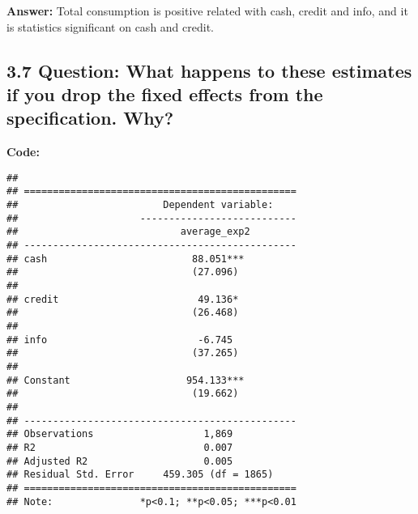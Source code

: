 \documentclass[
]{article}
\newenvironment{Shaded}{\begin{snugshade}}{\end{snugshade}}
\newcommand{\AttributeTok}[1]{\textcolor[rgb]{0.13,0.29,0.53}{#1}}
\newcommand{\ConstantTok}[1]{\textcolor[rgb]{0.56,0.35,0.01}{#1}}
\newcommand{\DecValTok}[1]{\textcolor[rgb]{0.00,0.00,0.81}{#1}}
\newcommand{\FloatTok}[1]{\textcolor[rgb]{0.00,0.00,0.81}{#1}}
\newcommand{\FunctionTok}[1]{\textcolor[rgb]{0.13,0.29,0.53}{\textbf{#1}}}
\newcommand{\NormalTok}[1]{#1}
\newcommand{\OtherTok}[1]{\textcolor[rgb]{0.56,0.35,0.01}{#1}}
\newcommand{\SpecialCharTok}[1]{\textcolor[rgb]{0.81,0.36,0.00}{\textbf{#1}}}
\newcommand{\StringTok}[1]{\textcolor[rgb]{0.31,0.60,0.02}{#1}}
\begin{document}
\textbf{Answer:} Total consumption is positive related with cash, credit
and info, and it is statistics significant on cash and credit.

\clearpage

\hypertarget{question-what-happens-to-these-estimates-if-you-drop-the-fixed-effects-from-the-specification.-why}{%
\subsection{\texorpdfstring{3.7 \textbf{Question: What happens to these
estimates if you drop the fixed effects from the specification. Why?
}}{3.7 Question: What happens to these estimates if you drop the fixed effects from the specification. Why? }}\label{question-what-happens-to-these-estimates-if-you-drop-the-fixed-effects-from-the-specification.-why}}

\textbf{Code:}

\begin{Shaded}
\end{Shaded}

\begin{verbatim}
## 
## ===============================================
##                         Dependent variable:    
##                     ---------------------------
##                            average_exp2        
## -----------------------------------------------
## cash                         88.051***         
##                              (27.096)          
##                                                
## credit                        49.136*          
##                              (26.468)          
##                                                
## info                          -6.745           
##                              (37.265)          
##                                                
## Constant                    954.133***         
##                              (19.662)          
##                                                
## -----------------------------------------------
## Observations                   1,869           
## R2                             0.007           
## Adjusted R2                    0.005           
## Residual Std. Error     459.305 (df = 1865)    
## ===============================================
## Note:               *p<0.1; **p<0.05; ***p<0.01
\end{verbatim}
\end{document}
